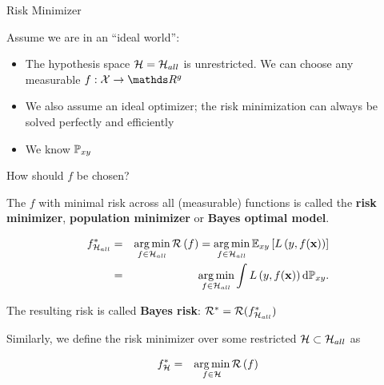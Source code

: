 \documentclass[11pt,compress,t,notes=noshow, xcolor=table]{beamer}
\begin{document}
\begin{vbframe}{Risk Minimizer}





\lz 

Assume we are in an \enquote{ideal world}: 

\begin{itemize}
	\item The hypothesis space $\mathcal{H}=\mathcal{H}_{all}$ is unrestricted. We can choose any measurable $f: \Xspace \to \R^g$ 
	\item We also assume an ideal optimizer; the risk minimization can always be 
        solved perfectly and efficiently
	\item We know $\mathbb{P}_{xy}$
\end{itemize}

How should $f$ be chosen? 


\framebreak 

The $f$ with minimal risk across all (measurable) functions 
is called the \textbf{risk minimizer}, \textbf{population minimizer} or \textbf{Bayes optimal model}. 

\begin{eqnarray*}
	f^{\ast}_{\mathcal{H}_{all}} &=& \mathop{\mathrm{arg\,min}}_{f \in \mathcal{H}_{all}} \mathcal{R}\left(f\right) = \mathop{\mathrm{arg\,min}}_{f \in \mathcal{H}_{all}}\mathbb{E}_{xy}\left[L\left(y, f(\mathbf{x})\right)\right]\\ &=&  \mathop{\mathrm{arg\,min}}_{f \in \mathcal{H}_{all}}\int L\left(y, f(\mathbf{x})\right) \text{d}\mathbb{P}_{xy}. 
\end{eqnarray*}

The resulting risk is called \textbf{Bayes risk}:  $\mathcal{R}^\ast_{} = \mathcal{R}(f^{\ast}_{\mathcal{H}_{all}})$

\lz


Similarly, we define the risk minimizer over some restricted $\mathcal{H} \subset \mathcal{H}_{all}$ as

\begin{eqnarray*}
	f^{\ast}_{\mathcal{H}} &=& \mathop{\mathrm{arg\,min}}_{f \in \mathcal{H}} \mathcal{R}\left(f\right)
\end{eqnarray*}





\end{vbframe}
\end{document}
